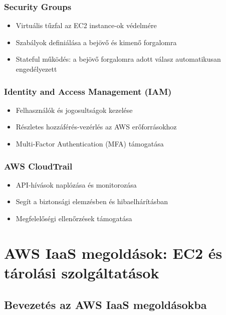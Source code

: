 \documentclass[a4paper,12pt]{article}
\begin{document}
    \subsubsection{Security Groups}

    \begin{itemize}
        \item Virtuális tűzfal az EC2 instance-ok védelmére
        \item Szabályok definiálása a bejövő és kimenő forgalomra
        \item Stateful működés: a bejövő forgalomra adott válasz automatikusan engedélyezett
    \end{itemize}

    \subsubsection{Identity and Access Management (IAM)}

    \begin{itemize}
        \item Felhasználók és jogosultságok kezelése
        \item Részletes hozzáférés-vezérlés az AWS erőforrásokhoz
        \item Multi-Factor Authentication (MFA) támogatása
    \end{itemize}

    \subsubsection{AWS CloudTrail}

    \begin{itemize}
        \item API-hívások naplózása és monitorozása
        \item Segít a biztonsági elemzésben és hibaelhárításban
        \item Megfelelőségi ellenőrzések támogatása
    \end{itemize}


    \section{AWS IaaS megoldások: EC2 és tárolási szolgáltatások}

    \subsection{Bevezetés az AWS IaaS megoldásokba}
\end{document}
